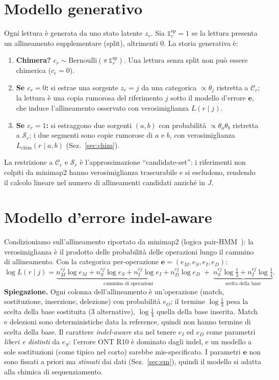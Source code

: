 \documentclass[11pt,a4paper]{article}
\newcommand{\bpi}{\pi}
\newcommand{\ee}{\mathbf{e}}
\newcommand{\Cand}{\mathcal{C}}
\newcommand{\Split}{\mathcal{S}}
\newcommand{\I}{\mathbb{1}}
\begin{document}
\section{Modello generativo}
Ogni lettura \`e generata da uno stato latente $z_r$. Sia $\I^{\mathrm{sp}}_r=1$ se la lettura presenta un allineamento supplementare (split), altrimenti $0$. La storia generativa \`e:
\begin{enumerate}[nosep,leftmargin=1.4em]
\item \textbf{Chimera?} $c_r\sim\text{Bernoulli}(\bpi\,\I^{\mathrm{sp}}_r)$. Una lettura senza split non pu\`o essere chimerica ($c_r=0$).
\item \textbf{Se $c_r=0$:} si estrae una sorgente $z_r=j$ da una categorica $\propto\theta_j$ ristretta a $\Cand_r$; la lettura \`e una copia rumorosa del riferimento $j$ sotto il modello d'errore $\ee$, che induce l'allineamento osservato con verosimiglianza $L(r\mid j)$.
\item \textbf{Se $c_r=1$:} si estraggono due sorgenti $(a,b)$ con probabilit\`a $\propto\theta_a\theta_b$ ristretta a $\Split_r$; i due segmenti sono copie rumorose di $a$ e $b$, con verosimiglianza $L_{\mathrm{chim}}(r\mid a,b)$ (Sez.~\ref{sec:chim}).
\end{enumerate}
La restrizione a $\Cand_r$ e $\Split_r$ \`e l'approssimazione ``candidate-set'': i riferimenti non colpiti da minimap2 hanno verosimiglianza trascurabile e si escludono, rendendo il calcolo lineare nel numero di allineamenti candidati anzich\'e in $J$.

\section{Modello d'errore indel-aware}\label{sec:err}
Condizioniamo sull'allineamento riportato da minimap2 (logica pair-HMM~\cite{durbin}): la verosimiglianza \`e il prodotto delle probabilit\`a delle operazioni lungo il cammino di allineamento. Con la categorica per-operazione $\ee=(e_M,e_S,e_I,e_D)$:
\begin{equation}
\log L(r\mid j)=\underbrace{n^{rj}_M\log e_M + n^{rj}_S\log e_S + n^{rj}_I\log e_I + n^{rj}_D\log e_D}_{\text{cammino di operazioni}}\;+\;\underbrace{n^{rj}_S\log\tfrac13 + n^{rj}_I\log\tfrac14}_{\text{scelta della base}} .
\label{eq:Lrj}
\end{equation}
\textbf{Spiegazione.} Ogni colonna dell'allineamento \`e un'operazione (match, sostituzione, inserzione, delezione) con probabilit\`a $e_O$; il termine $\log\frac13$ pesa la scelta della base sostituita (3 alternative), $\log\frac14$ quella della base inserita. Match e delezioni sono deterministiche data la reference, quindi non hanno termine di scelta della base. Il carattere \emph{indel-aware} sta nel tenere $e_I$ ed $e_D$ come parametri \emph{liberi e distinti} da $e_S$: l'errore ONT R10 \`e dominato dagli indel, e un modello a sole sostituzioni (come tipico nel corto) sarebbe mis-specificato. I parametri $\ee$ non sono fissati a priori ma \emph{stimati} dai dati (Sez.~\ref{sec:em}), quindi il modello si adatta alla chimica di sequenziamento.
\end{document}
